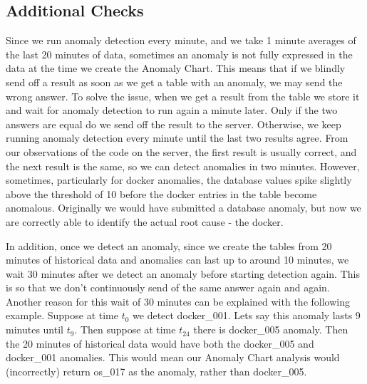 \documentclass[12pt]{article}
\begin{document}
\subsection{Additional Checks}
Since we run anomaly detection every minute, and we take 1 minute averages of the last 20 minutes of data, sometimes an anomaly is not fully expressed in the data at the time we create the Anomaly Chart. This means that if we blindly send off a result as soon as we get a table with an anomaly, we may send the wrong answer. To solve the issue, when we get a result from the table we store it and wait for anomaly detection to run again a minute later. Only if the two answers are equal do we send off the result to the server. Otherwise, we keep running anomaly detection every minute until the last two results agree. From our observations of the code on the server, the first result is usually correct, and the next result is the same, so we can detect anomalies in two minutes. However, sometimes, particularly for docker anomalies, the database values spike slightly above the threshold of 10 before the docker entries in the table become anomalous. Originally we would have submitted a database anomaly, but now we are correctly able to identify the actual root cause - the docker.

In addition, once we detect an anomaly, since we create the tables from 20 minutes of historical data and anomalies can last up to around 10 minutes, we wait 30 minutes after we detect an anomaly before starting detection again. This is so that we don't continuously send of the same answer again and again. Another reason for this wait of 30 minutes can be explained with the following example. Suppose at time $t_0$ we detect docker\_001. Lets say this anomaly lasts 9 minutes until $t_9$. Then suppose at time $t_24$ there is docker\_005 anomaly. Then the 20 minutes of historical data would have both the docker\_005 and docker\_001 anomalies. This would mean our Anomaly Chart analysis would (incorrectly) return os\_017 as the anomaly, rather than docker\_005.
\end{document}

